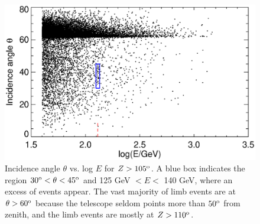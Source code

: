 \documentclass[aps,twocolumn,prd,superscriptaddress,showpacs,nofootinbib,fixfloat]{revtex4}
\newcommand{\degree}{^{\rm o}}
\begin{document}
\begin{figure}
  \centering
  \includegraphics[width=1.0\linewidth]{plots/theta-E.ps}
  \caption{Incidence angle $\theta$ vs. log $E$ for $Z > 105\degree$.  A blue
  box indicates the region $30\degree < \theta < 45\degree$ and 125 GeV $< E
  <$ 140 GeV, where an excess of events appear.  The vast majority of limb
  events are at $\theta > 60\degree$ because the telescope seldom points more
  than $50\degree$ from zenith, and the limb events are mostly at
  $Z>110\degree$.}
  \label{fig:theta-E}
\end{figure}
\end{document}
